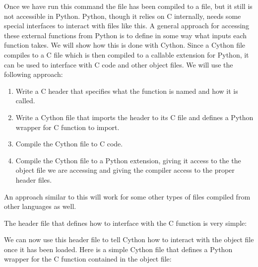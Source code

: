 Once we have run this command the file has been compiled to a \of file, but it still is not accessible in Python.
Python, though it relies on C internally, needs some special interfaces to interact with \of files like this.
A general approach for accessing these external functions from Python is to define in some way what inputs each function takes.
We will show how this is done with Cython.
Since a Cython file compiles to a C file which is then compiled to a callable extension for Python, it can be used to interface with C code and other object files.
We will use the following approach:
\begin{enumerate}
\item Write a C header that specifies what the function is named and how it is called.
\item Write a Cython file that imports the header to its C file and defines a Python wrapper for C function to import.
\item Compile the Cython file to C code.
\item Compile the Cython file to a Python extension, giving it access to the the object file we are accessing and giving the compiler access to the proper header files.
\end{enumerate}

An approach similar to this will work for some other types of \of files compiled from other languages as well.

The header file that defines how to interface with the C function is very simple:



We can now use this header file to tell Cython how to interact with the object file once it has been loaded.
Here is a simple Cython file that defines a Python wrapper for the C function contained in the object file:



